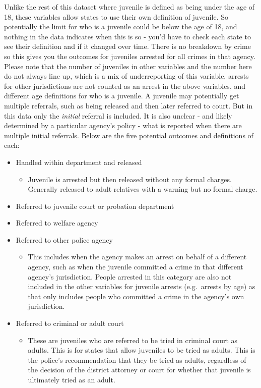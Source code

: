 \documentclass[
  12pt,
  openany]{book}
\providecommand{\tightlist}{%
  \setlength{\itemsep}{0pt}\setlength{\parskip}{0pt}}
\begin{document}
Unlike the rest of this dataset where juvenile is defined as being under the age of 18, these variables allow states to use their own definition of juvenile. So potentially the limit for who is a juvenile could be below the age of 18, and nothing in the data indicates when this is so - you'd have to check each state to see their definition and if it changed over time. There is no breakdown by crime so this gives you the outcomes for juveniles arrested for all crimes in that agency. Please note that the number of juveniles in other variables and the number here do not always line up, which is a mix of underreporting of this variable, arrests for other jurisdictions are not counted as an arrest in the above variables, and different age definitions for who is a juvenile. A juvenile may potentially get multiple referrals, such as being released and then later referred to court. But in this data only the \emph{initial} referral is included. It is also unclear - and likely determined by a particular agency's policy - what is reported when there are multiple initial referrals. Below are the five potential outcomes and definitions of each:

\begin{itemize}
\tightlist
\item
  Handled within department and released

  \begin{itemize}
  \tightlist
  \item
    Juvenile is arrested but then released without any formal charges. Generally released to adult relatives with a warning but no formal charge.
  \end{itemize}
\item
  Referred to juvenile court or probation department
\item
  Referred to welfare agency
\item
  Referred to other police agency

  \begin{itemize}
  \tightlist
  \item
    This includes when the agency makes an arrest on behalf of a different agency, such as when the juvenile committed a crime in that different agency's jurisdiction. People arrested in this category are also not included in the other variables for juvenile arrests (e.g.~arrests by age) as that only includes people who committed a crime in the agency's own jurisdiction.
  \end{itemize}
\item
  Referred to criminal or adult court

  \begin{itemize}
  \tightlist
  \item
    These are juveniles who are referred to be tried in criminal court as adults. This is for states that allow juveniles to be tried as adults. This is the police's recommendation that they be tried as adults, regardless of the decision of the district attorney or court for whether that juvenile is ultimately tried as an adult.
  \end{itemize}
\end{itemize}
\end{document}
